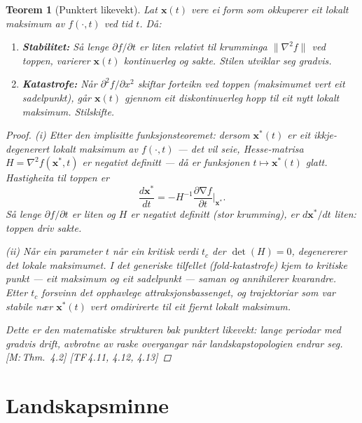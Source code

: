 \documentclass[10pt]{book}
\theoremstyle{definition}
\theoremstyle{plain}
\newtheorem{teorem}[definisjon]{Teorem}
\theoremstyle{remark}
\newcommand{\norm}[1]{\lVert #1 \rVert}
\DeclareMathOperator{\grad}{\nabla}
\newcommand{\TF}[1]{\textnormal{[TF\,#1]}}
\newcommand{\Mref}[1]{\textnormal{[M:\,#1]}}
\begin{document}
\begin{teorem}[Punktert likevekt]\label{thm:punktert}
Lat $\bm{x}(t)$ vere ei form som okkuperer eit lokalt maksimum av $f(\cdot, t)$ ved tid $t$. D\aa:

\begin{enumerate}[label=(\roman*)]
  \item \textbf{Stabilitet:} S\aa{} lenge $\partial f / \partial t$ er liten relativt til krumminga $\norm{\nabla^2 f}$ ved toppen, varierer $\bm{x}(t)$ kontinuerleg og sakte. Stilen utviklar seg gradvis.
  \item \textbf{Katastrofe:} N\aa r $\partial^2 f / \partial x^2$ skiftar forteikn ved toppen (maksimumet vert eit sadelpunkt), g\aa r $\bm{x}(t)$ gjennom eit diskontinuerleg hopp til eit nytt lokalt maksimum. Stilskifte.
\end{enumerate}

\begin{proof}
\textit{(i)} Etter den implisitte funksjonsteoremet: dersom $\bm{x}^*(t)$ er eit ikkje-degenerert lokalt maksimum av $f(\cdot, t)$ --- det vil seie, Hesse-matrisa $H = \nabla^2 f(\bm{x}^*, t)$ er negativt definitt --- d\aa{} er funksjonen $t \mapsto \bm{x}^*(t)$ glatt. Hastigheita til toppen er
\[
  \frac{d\bm{x}^*}{dt} = -H^{-1} \frac{\partial \grad f}{\partial t}\bigg|_{\bm{x}^*}.
\]
S\aa{} lenge $\partial f / \partial t$ er liten og $H$ er negativt definitt (stor krumming), er $d\bm{x}^*/dt$ liten: toppen driv sakte.

\textit{(ii)} N\aa r ein parameter $t$ n\aa r ein kritisk verdi $t_c$ der $\det(H) = 0$, degenererer det lokale maksimumet. I det generiske tilfellet (fold-katastrofe) kjem to kritiske punkt --- eit maksimum og eit sadelpunkt --- saman og annihilerer kvarandre. Etter $t_c$ forsvinn det opphavlege attraksjonsbassenget, og trajektoriar som var stabile n\ae r $\bm{x}^*(t)$ vert omdirirerte til eit fjernt lokalt maksimum.

Dette er den matematiske strukturen bak punktert likevekt: lange periodar med gradvis drift, avbrotne av raske overgangar n\aa r landskapstopologien endrar seg. \Mref{Thm.~4.2} \TF{4.11, 4.12, 4.13}
\end{proof}
\end{teorem}

\section{Landskapsminne}\label{sec:dyn:minne}
\end{document}
